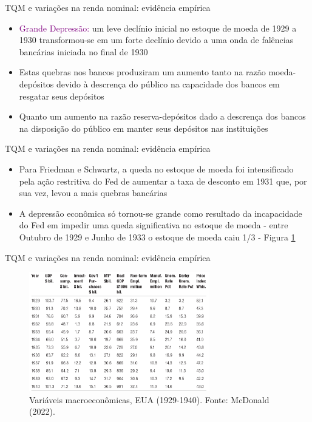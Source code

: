 \documentclass[10pt]{beamer}
\begin{document}
\begin{frame}{TQM e variações na renda nominal: evidência empírica}
    \begin{itemize}
        \item \textcolor{purple}{Grande Depressão:} um leve declínio inicial no estoque de moeda de 1929 a 1930 transformou-se em um forte declínio devido a uma onda de falências bancárias iniciada no final de 1930
        \bigskip
        \item Estas quebras nos bancos produziram um aumento tanto na razão moeda-depósitos devido à descrença do público na capacidade dos bancos em resgatar seus depósitos
        \bigskip
        \item Quanto um aumento na razão reserva-depósitos dado a descrença dos bancos na disposição do público em manter seus depósitos nas instituições
    \end{itemize}
\end{frame}

\begin{frame}{TQM e variações na renda nominal: evidência empírica}
    \begin{itemize}
        \item Para Friedman e Schwartz, a queda no estoque de moeda foi intensificado pela ação restritiva do Fed de aumentar a taxa de desconto em 1931 que, por sua vez, levou a mais quebras bancárias
        \bigskip
        \item A depressão econômica só tornou-se grande como resultado da incapacidade do Fed em impedir uma queda significativa no estoque de moeda - entre Outubro de 1929 e Junho de 1933 o estoque de moeda caiu 1/3 - Figura \ref{fig5}
    \end{itemize}
\end{frame}

\begin{frame}{TQM e variações na renda nominal: evidência empírica}
    \begin{figure}
        \centering
        \includegraphics[width=0.7\textwidth]{./figures/aula10_fig5.PNG}
        \caption{Variáveis macroeconômicas, EUA (1929-1940). Fonte: McDonald (2022).}
        \label{fig5}
    \end{figure}
\end{frame}
\end{document}
